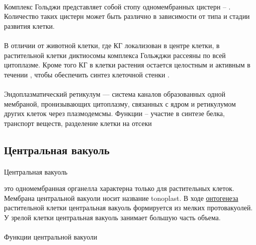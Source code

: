 \paragraph*{}Комплекс Гольджи представляет собой стопу одномембранных цистерн -- . Количество таких цистерн может быть различно в зависимости от типа и стадии развития клетки.

\paragraph*{} 

\paragraph*{}В отличии от животной клетки, где КГ локализован в центре клетки, в растительной клетки диктиосомы комплекса Гольжджи рассеяны по всей цитоплазме. Кроме того КГ в клетки растения остается целостным и активным в течении , чтобы обеспечить синтез клеточной стенки  \cite{fzr_ermakov}.

\paragraph*{}Эндоплазматический ретикулум — система каналов образованных одной мембраной, пронизывающих цитоплазму, связанных с ядром и ретикулумом других клеток через плазмодемсмы. Функции -- участие в синтезе белка, транспорт веществ, разделение клетки на отсеки

\subsection*{Центральная вакуоль}

\paragraph*{}\hypertarget{cell_vakuol}{Центральная вакуоль} это одномембранная органелла характерна только для растительных клеток. Мембрана центральной вакуоли носит название \gls{tonoplast}. В ходе \hyperlink{ontogenesis}{онтогенеза} растительной клетки центральная вакуоль формируется из мелких протовакуолей. У зрелой клетки центральная вакуоль занимает большую часть объема.

\paragraph*{}Функции центральной вакуоли 

